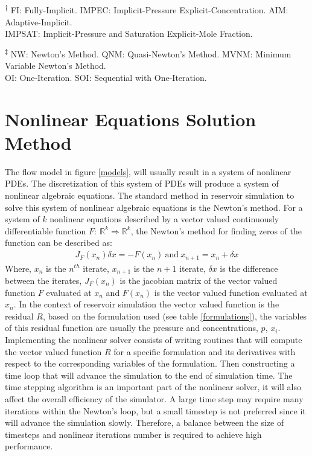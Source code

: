 \begin{table}[h]
\begin{threeparttable}
	\begin{tablenotes}
	\small
	\item [\textsuperscript{$\dag$}] FI: Fully-Implicit. IMPEC: Implicit-Pressure Explicit-Concentration. AIM: Adaptive-Implicit.\\
		\phantom{x}\hspace{0.1cm}IMPSAT: Implicit-Pressure and Saturation Explicit-Mole Fraction.
	\item [\textsuperscript{$\ddag$}] NW: Newton's Method. QNM: Quasi-Newton's Method. MVNM: Minimum Variable Newton's Method.\\
		\phantom{x}\hspace{0.1cm} OI: One-Iteration. SOI: Sequential with One-Iteration.
	\end{tablenotes}
	\end{threeparttable}
\end{table}%

\section{Nonlinear Equations Solution Method}
The flow model in figure \ref{models}, will usually result in a system of nonlinear PDEs. The discretization of this system of PDEs will
produce a system of nonlinear algebraic equations. The standard method in reservoir simulation to solve this system of nonlinear
algebraic equations is the Newton's method. For a system of $k$ nonlinear equations described by a vector valued continuously differentiable 
function $F: \ \mathbb{R}^{k}\Rightarrow\mathbb{R}^{k}$, the Newton's method for finding zeros of the function can be described as:
\begin{align}
	J_{F}(x_{n})\delta x = -F(x_{n}) \ \text{and} \ x_{n+1} = x_{n} +\delta x
\end{align}
Where, $x_{n}$ is the $n^{th}$ iterate, $x_{n+1}$ is the $n+1$ iterate, $\delta x$ is the difference between the iterates, $J_{F}(x_{n})$ is the
jacobian matrix of the vector valued function $F$ evaluated at $x_{n}$ and $F(x_{n})$ is the vector valued function evaluated at $x_{n}$.
In the context of reservoir simulation the vector valued function is the residual $R$, based on the formulation used (see table \ref{formulations}), the variables 
of this residual function are usually the pressure and concentrations, $p$, $x_{i}$. Implementing the nonlinear solver consists of writing routines that will compute
the vector valued function $R$ for a specific formulation and its derivatives with respect to the corresponding variables of the formulation. Then constructing a time loop
that will advance the simulation to the end of simulation time. The time stepping algorithm is an important part of the nonlinear solver, it will also affect the
overall efficiency of the simulator. A large time step may require many iterations within the Newton's loop, but a small timestep is not preferred since it will advance
the simulation slowly. Therefore, a balance between the size of timesteps and nonlinear iterations number is required to achieve high performance. 

